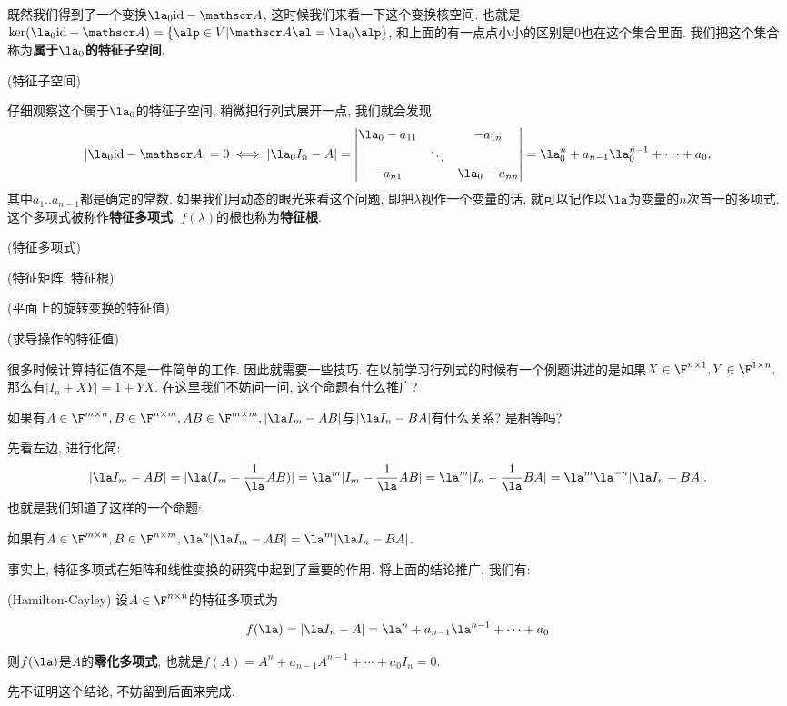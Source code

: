 既然我们得到了一个变换$\la_{0}\id-\huaa$, 这时候我们来看一下这个变换核空间. 也就是$\ker(\la_{0}\id-\huaa)=\{\alp\in V|\huaa\al=\la_{0}\alp\}$,
和上面的有一点点小小的区别是0也在这个集合里面. 我们把这个集合称为\textbf{属于$\la_{0}$的特征子空间}. 
\begin{defn}
\label{def:eigen-sub-space}(特征子空间)
\end{defn}
仔细观察这个属于$\la_{0}$的特征子空间, 稍微把行列式展开一点, 我们就会发现
\[
|\la_{0}\id-\huaa|=0\iff|\la_{0}I_{n}-A|=\begin{vmatrix}\la_{0}-a_{11} &  & -a_{1n}\\
 & \ddots\\
-a_{n1} &  & \la_{0}-a_{nn}
\end{vmatrix}=\la_{0}^{n}+a_{n-1}\la_{0}^{n-1}+\cdots+a_{0},
\]
其中$a_{1}..a_{n-1}$都是确定的常数. 如果我们用动态的眼光来看这个问题, 即把$\lambda$视作一个变量的话,
就可以记作以$\la$为变量的$n$次首一的多项式. 这个多项式被称作\textbf{特征多项式}. $f(\lambda)$的根也称为\textbf{特征根}. 
\begin{defn}
(特征多项式)
\end{defn}
%
\begin{defn}
(特征矩阵, 特征根)
\end{defn}
\begin{example}
(平面上的旋转变换的特征值)
\end{example}
%
\begin{example}
(求导操作的特征值)
\end{example}
很多时候计算特征值不是一件简单的工作. 因此就需要一些技巧. 在以前学习行列式的时候有一个例题讲述的是如果$X\in\F^{n\times1},Y\in\F^{1\times n},$那么有$|I_{n}+XY|=1+YX$.
在这里我们不妨问一问, 这个命题有什么推广?
\begin{problem}
如果有$A\in\F^{m\times n},B\in\F^{n\times m},AB\in\F^{m\times m},|\la I_{m}-AB|$与$|\la I_{n}-BA|$有什么关系?
是相等吗?
\end{problem}
先看左边, 进行化简: 
\[
|\la I_{m}-AB|=|\la(I_{m}-\frac{1}{\la}AB)|=\la^{m}|I_{m}-\frac{1}{\la}AB|=\la^{m}|I_{n}-\frac{1}{\la}BA|=\la^{m}\la^{-n}|\la I_{n}-BA|.
\]
 也就是我们知道了这样的一个命题: 
\begin{prop}
如果有$A\in\F^{m\times n},B\in\F^{n\times m},\la^{n}|\la I_{m}-AB|=\la^{m}|\la I_{n}-BA|$.
\end{prop}
事实上, 特征多项式在矩阵和线性变换的研究中起到了重要的作用. 将上面的结论推广, 我们有:
\begin{thm}
(Hamilton-Cayley) 设$A\in\F^{n\times n}$的特征多项式为

\[
f(\la)=|\la I_{n}-A|=\la^{n}+a_{n-1}\la^{n-1}+\cdots+a_{0}
\]

则$f(\la)$是$A$的\textbf{零化多项式}, 也就是$f(A)=A^{n}+a_{n-1}A^{n-1}+\cdots+a_{0}I_{n}=0$. 
\end{thm}
先不证明这个结论, 不妨留到后面来完成. 

